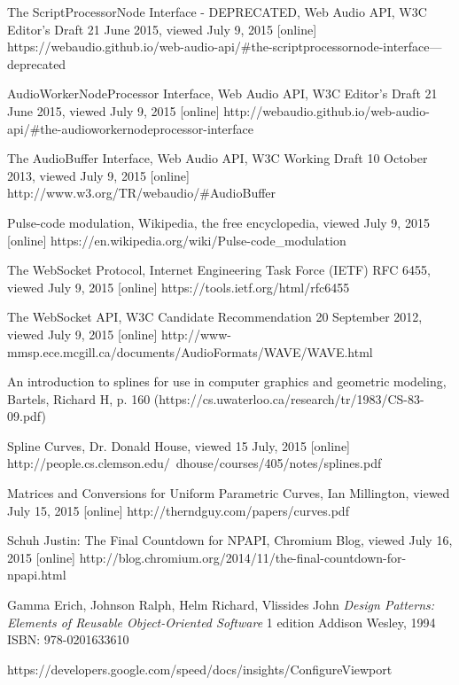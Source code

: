 \begin{thebibliography}{99}
The ScriptProcessorNode Interface - DEPRECATED, Web Audio API, W3C Editor's Draft 21 June 2015, viewed July 9, 2015 [online]
https://webaudio.github.io/web-audio-api/\#the-scriptprocessornode-interface---deprecated

AudioWorkerNodeProcessor Interface, Web Audio API, W3C Editor's Draft 21 June 2015, viewed July 9, 2015 [online]
http://webaudio.github.io/web-audio-api/\#the-audioworkernodeprocessor-interface	

The AudioBuffer Interface, Web Audio API, W3C Working Draft 10 October 2013, viewed July 9, 2015 [online]
http://www.w3.org/TR/webaudio/\#AudioBuffer

Pulse-code modulation, Wikipedia, the free encyclopedia, viewed July 9, 2015 [online]
https://en.wikipedia.org/wiki/Pulse-code\_modulation

The WebSocket Protocol, Internet Engineering Task Force (IETF) RFC 6455, viewed July 9, 2015 [online]
https://tools.ietf.org/html/rfc6455

The WebSocket API, W3C Candidate Recommendation 20 September 2012, viewed July 9, 2015 [online]
http://www-mmsp.ece.mcgill.ca/documents/AudioFormats/WAVE/WAVE.html

An introduction to splines for use in computer graphics and geometric modeling, Bartels, Richard H, p. 160
(https://cs.uwaterloo.ca/research/tr/1983/CS-83-09.pdf)

Spline Curves, Dr. Donald House, viewed 15 July, 2015 [online]
http://people.cs.clemson.edu/~dhouse/courses/405/notes/splines.pdf

Matrices and Conversions for Uniform Parametric Curves, Ian Millington, viewed July 15, 2015 [online]
http://therndguy.com/papers/curves.pdf

{\sc Schuh} Justin: The Final Countdown for NPAPI, Chromium Blog, viewed July 16, 2015 [online]
http://blog.chromium.org/2014/11/the-final-countdown-for-npapi.html

{\sc Gamma} Erich, {\sc Johnson} Ralph, {\sc Helm} Richard, {\sc Vlissides} John
\emph{Design Patterns: Elements of Reusable Object-Oriented Software}
1 edition
Addison Wesley, 1994
ISBN: 978-0201633610




https://developers.google.com/speed/docs/insights/ConfigureViewport

\end{thebibliography}
